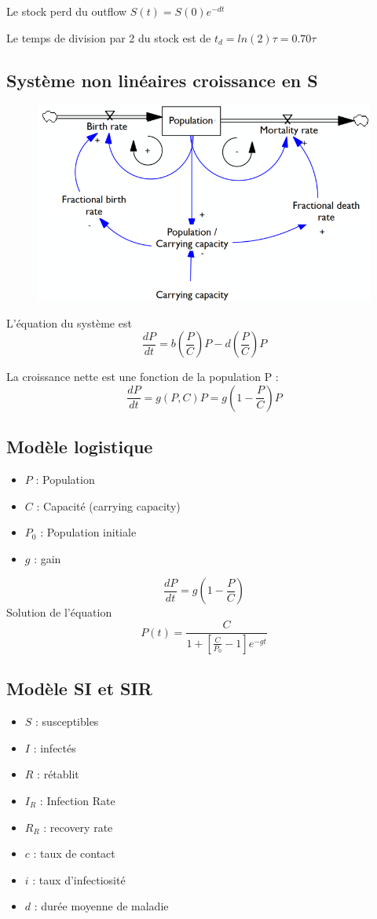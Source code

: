 \documentclass[resume]{subfiles}
\begin{document}
Le stock perd du outflow $S(t)=S(0)e^{-dt}$ 

Le temps de division par 2 du stock est de $t_d=ln(2)\tau=0.70\tau$ 

\subsection{Système non linéaires croissance en S}

\begin{figure}[H]
    \centering
    \includegraphics[width=1\columnwidth]{Figures/FDM_3.png}
\end{figure}

L'équation du système est
$$\frac{dP}{dt}=b(\frac{P}{C})P-d(\frac{P}{C})P$$

La croissance nette est une fonction de la population P :
$$\frac{dP}{dt}=g(P,C)P=g(1-\frac{P}{C})P$$


\subsection{Modèle logistique}
\begin{itemize}
\item $P$ : Population
\item $C$ : Capacité (carrying capacity)
\item $P_0$ : Population initiale
\item $g$ : gain
\end{itemize}
$$\frac{dP}{dt}=g(1-\frac{P}{C})$$
Solution de l'équation 
$$P(t)= \frac{C}{1+[\frac{C}{P_0}-1]e^{-gt}}$$

\subsection{Modèle SI et SIR}
\begin{itemize}
\item $S$ : susceptibles
\item $I$ : infectés
\item $R$ : rétablit
\item $I_R$ : Infection Rate
\item $R_R$ : recovery rate
\item $c$ : taux de contact
\item $i$ : taux d'infectiosité
\item $d$ : durée moyenne de maladie
\end{itemize}
\end{document}
